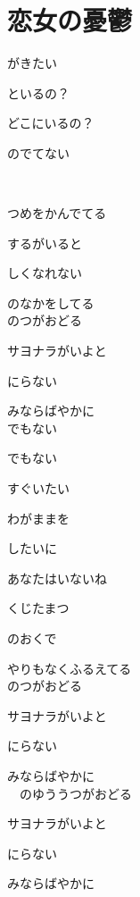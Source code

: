 \section{ 恋女の憂鬱}
\large{

がきたい

といるの？

どこにいるの？

のでてない

　

つめをかんでてる

するがいると

しくなれない

のなかをしてる
\\

のつがおどる

サヨナラがいよと

にらない

みならばやかに
\\

でもない

でもない

すぐいたい

わがままを

したいに

あなたはいないね

くじたまつ

のおくで

やりもなくふるえてる
\\

のつがおどる

サヨナラがいよと

にらない

みならばやかに
\\

　のゆううつがおどる

サヨナラがいよと

にらない

みならばやかに

}